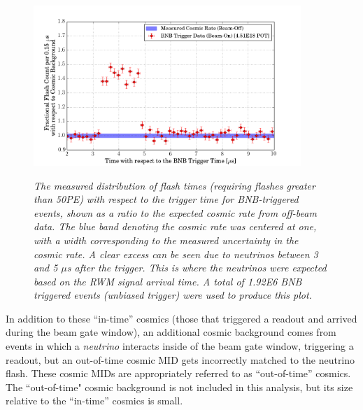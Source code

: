 \begin{figure}[ht!]
\centering
\includegraphics[width=0.9\textwidth]{Figures/BNB_flashtimeplot.png}\\
\caption{\textit{The measured distribution of flash times (requiring flashes greater than 50PE) with respect to the trigger time for BNB-triggered events, shown as a ratio to the expected cosmic rate from off-beam data. The blue band denoting the cosmic rate was centered at one, with a width corresponding to the measured uncertainty in the cosmic rate. A clear excess can be seen due to neutrinos between 3 and 5 $\mu$s after the trigger. This is where the neutrinos were expected based on the RWM signal arrival time. A total of 1.92E6 BNB triggered events (unbiased trigger) were used to produce this plot.}}
\label{BNB_flashtime_data_plot}
\end{figure}


In addition to these ``in-time'' cosmics (those that triggered a readout and arrived during the beam gate window), an additional cosmic background comes from events in which a \textit{neutrino} interacts inside of the beam gate window, triggering a readout, but an out-of-time cosmic MID gets incorrectly matched to the neutrino flash. These cosmic MIDs are appropriately referred to as ``out-of-time'' cosmics. The ``out-of-time" cosmic background is not included in this analysis, but its size relative to the ``in-time'' cosmics is small.\\

